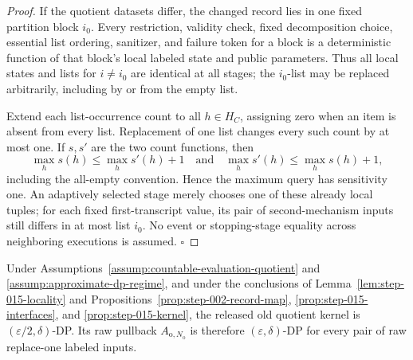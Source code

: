 \begin{proof}
If the quotient datasets differ, the changed record lies in one fixed
partition block \(i_0\). Every restriction, validity check, fixed
decomposition choice, essential list ordering, sanitizer, and failure token
for a block is a deterministic function of that block's local labeled
state and public parameters. Thus all local states and lists for
\(i\ne i_0\) are identical at all stages; the \(i_0\)-list may be
replaced arbitrarily, including by or from the empty list.

Extend each list-occurrence count to all \(h\in H_C\), assigning zero when
an item is absent from every list. Replacement of one list changes every
such count by at most one. If \(s,s'\) are the two count functions, then
\[
\max_hs(h)\le\max_hs'(h)+1
\quad\text{and}\quad
\max_hs'(h)\le\max_hs(h)+1,
\]
including the all-empty convention. Hence the maximum query has
sensitivity one. An adaptively selected stage merely chooses one of these
already local tuples; for each fixed first-transcript value, its pair of
second-mechanism inputs still differs in at most list \(i_0\). No event or
stopping-stage equality across neighboring executions is assumed.
\(\square\)


\end{proof}

\begin{proposition}\label{prop:step-015-dp}
Under Assumptions~\ref{assump:countable-evaluation-quotient} and
\ref{assump:approximate-dp-regime}, and under the conclusions of
Lemma~\ref{lem:step-015-locality} and
Propositions~\ref{prop:step-002-record-map},
\ref{prop:step-015-interfaces}, and
\ref{prop:step-015-kernel}, the released old quotient kernel is
\((\varepsilon/2,\delta)\)-DP. Its raw pullback
\(A_{\mathrm o,N_{\mathrm o}}\) is therefore
\((\varepsilon,\delta)\)-DP for every pair of raw replace-one labeled
inputs.


\end{proposition}

